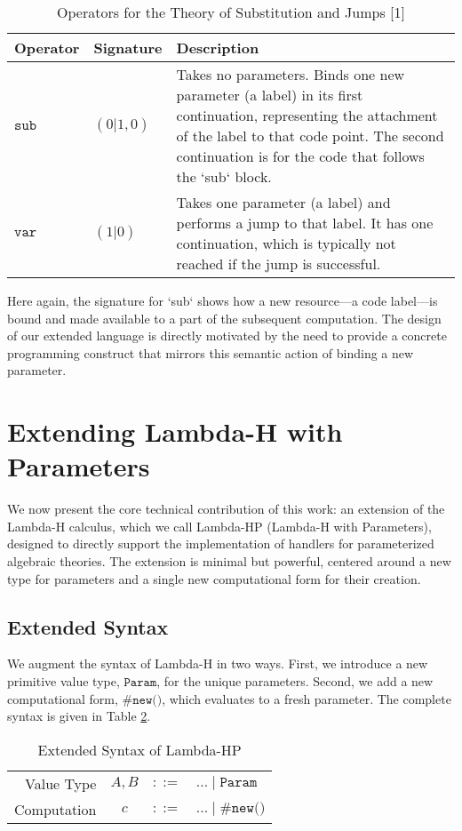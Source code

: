 \documentclass{article}
\begin{document}
\begin{table}[h!]
\centering
\caption{Operators for the Theory of Substitution and Jumps [1]}
\label{tab:subst}
\begin{tabular}{l l p{8cm}}
\hline
\textbf{Operator} & \textbf{Signature} & \textbf{Description} \\
\hline
$\texttt{sub}$ & $(0|1,0)$ & Takes no parameters. Binds one new parameter (a label) in its first continuation, representing the attachment of the label to that code point. The second continuation is for the code that follows the `sub` block. \\
$\texttt{var}$ & $(1|0)$ & Takes one parameter (a label) and performs a jump to that label. It has one continuation, which is typically not reached if the jump is successful. \\
\hline
\end{tabular}
\end{table}

Here again, the signature for `sub` shows how a new resource—a code label—is bound and made available to a part of the subsequent computation. The design of our extended language is directly motivated by the need to provide a concrete programming construct that mirrors this semantic action of binding a new parameter.

\section{Extending Lambda-H with Parameters}
We now present the core technical contribution of this work: an extension of the Lambda-H calculus, which we call Lambda-HP (Lambda-H with Parameters), designed to directly support the implementation of handlers for parameterized algebraic theories. The extension is minimal but powerful, centered around a new type for parameters and a single new computational form for their creation.

\subsection{Extended Syntax}
We augment the syntax of Lambda-H in two ways. First, we introduce a new primitive value type, $\texttt{Param}$, for the unique parameters. Second, we add a new computational form, $\texttt{\#new()}$, which evaluates to a fresh parameter. The complete syntax is given in Table \ref{tab:extsyntax}.

\begin{table}[h!]
\centering
\caption{Extended Syntax of Lambda-HP}
\label{tab:extsyntax}
\begin{tabular}{r c l l}
\hline
Value Type & $A, B$ & $::=$ & $\dots \mid \texttt{Param}$ \\
Computation & $c$ & $::=$ & $\dots \mid \texttt{\#new()}$ \\
\hline
\end{tabular}
\end{table}
\end{document}

